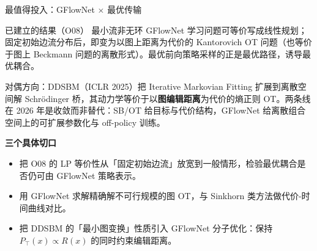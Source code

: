 \documentclass[aspectratio=169,10pt]{beamer}
\begin{document}
\begin{frame}{最值得投入：GFlowNet $\times$ 最优传输}
  \begin{exampleblock}{已建立的结果（O08）}
    最小流非无环 GFlowNet 学习问题可等价写成线性规划；固定初始边流分布后，即变为以图上距离为代价的 Kantorovich OT 问题（也等价于图上 Beckmann 问题的离散形式）。最优前向策略采样的正是最优路径，诱导最优耦合。
  \end{exampleblock}

  \vspace{4pt}
  对偶方向：DDSBM（ICLR 2025）把 Iterative Markovian Fitting 扩展到离散空间解 Schrödinger 桥，其动力学等价于以\textbf{图编辑距离}为代价的熵正则 OT。两条线在 2026 年是收敛而非替代：SB/OT 给目标与代价结构，GFlowNet 给离散组合空间上的可扩展参数化与 off-policy 训练。

  \vspace{4pt}
  \textbf{三个具体切口}
  \begin{itemize}
    \item 把 O08 的 LP 等价性从「固定初始边流」放宽到一般情形，检验最优耦合是否仍可由 GFlowNet 策略表示。
    \item 用 GFlowNet 求解精确解不可行规模的图 OT，与 Sinkhorn 类方法做代价-时间曲线对比。
    \item 把 DDSBM 的「最小图变换」性质引入 GFlowNet 分子优化：保持 $P_\top(x) \propto R(x)$ 的同时约束编辑距离。
  \end{itemize}
\end{frame}
\end{document}
